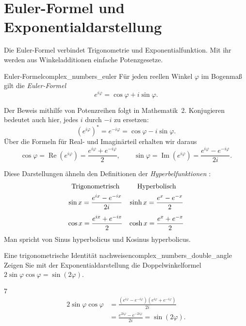 \section{Euler-Formel und Exponentialdarstellung}
\label{sec:complex_numbers_exponential_form}
Die Euler-Formel verbindet Trigonometrie und Exponentialfunktion.
Mit ihr werden aus Winkeladditionen einfache Potenzgesetze.

\begin{TheoremBox}{Euler-Formel}{complex_numbers_euler}
  Für jeden reellen Winkel $\varphi$ im Bogenmaß gilt die
  \emph{Euler-Formel} 
  \[
    e^{i\varphi}=\cos\varphi+i\sin\varphi.
  \]
\end{TheoremBox}
Der Beweis mithilfe von Potenzreihen folgt in Mathematik~2.
Konjugieren bedeutet auch hier, jedes $i$ durch $-i$ zu ersetzen:
\[
  (e^{i\varphi})^*=e^{-i\varphi}
    =\cos\varphi-i\sin\varphi.
\]
Über die Formeln für Real- und Imaginärteil erhalten wir daraus
\[
  \cos\varphi=\operatorname{Re}(e^{i\varphi})
    =\frac{e^{i\varphi}+e^{-i\varphi}}2,\qquad
  \sin\varphi=\operatorname{Im}(e^{i\varphi})
    =\frac{e^{i\varphi}-e^{-i\varphi}}{2i}.
\]
\begin{RemarkBox}[remark title=Vergleich mit Hyperbelfunktionen]
  Diese Darstellungen ähneln den Definitionen der
  \emph{Hyperbelfunktionen} :
  \[
    \begin{array}{@{}cc@{}}
      \text{Trigonometrisch}&\text{Hyperbolisch}\\[5pt]
      \displaystyle\sin x=\frac{e^{ix}-e^{-ix}}{2i}
        &\displaystyle\sinh x=\frac{e^x-e^{-x}}2\\[12pt]
      \displaystyle\cos x=\frac{e^{ix}+e^{-ix}}2
        &\displaystyle\cosh x=\frac{e^x+e^{-x}}2
    \end{array}
  \]
  Man spricht von Sinus hyperbolicus und Kosinus hyperbolicus.
\end{RemarkBox}
\begin{ExampleBox}{Eine trigonometrische Identität nachweisen}{complex_numbers_double_angle}
  Zeigen Sie mit der Exponentialdarstellung die Doppelwinkelformel
  $2\sin\varphi\cos\varphi=\sin(2\varphi)$.
  \begin{ClozeArea}{7}
    \[
      \begin{aligned}
        2\sin\varphi\cos\varphi
          &=\frac{(e^{i\varphi}-e^{-i\varphi})(e^{i\varphi}+e^{-i\varphi})}{2i}\\[7pt]
          &=\frac{e^{2i\varphi}-e^{-2i\varphi}}{2i}
           =\sin(2\varphi).
      \end{aligned}
    \]
  \end{ClozeArea}
\end{ExampleBox}

